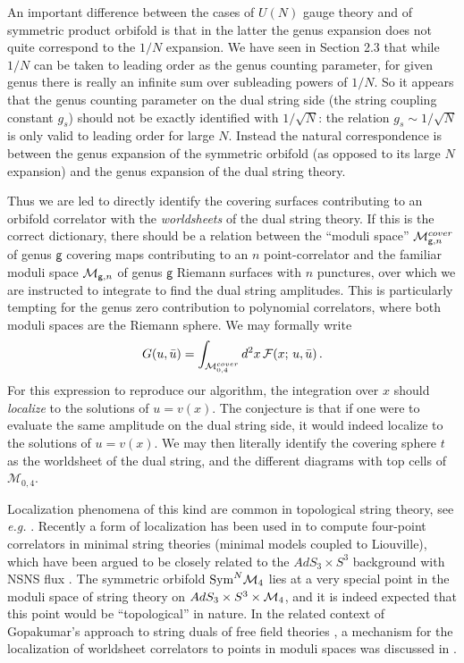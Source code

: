 \documentclass[letterpaper]{JHEP3}
\def\be{\begin{equation}}
\def\ee{\end{equation}}
\def\be{\begin{eqnarray}}
\def\ee{\end{eqnarray}}
\def\gg{\mathsf g }
\begin{document}
An important difference between the cases of  $U(N)$ gauge theory and of symmetric product orbifold
 is that in the  latter the genus expansion does not quite correspond to the $1/N$ expansion.
 We have seen in Section 2.3 that while $1/N$ can be taken to leading order as the genus counting parameter,
 for given genus there is really an infinite sum over subleading powers of $1/N$.
 So it appears that the genus counting parameter on the dual string side
(the string coupling constant $g_s$)   should not be exactly identified with $1/\sqrt{N}$:
the relation $g_s \sim 1/\sqrt{N}$ is only valid to leading order for large $N$.
Instead the natural correspondence is between the genus expansion
 of the symmetric orbifold (as opposed to its large $N$ expansion) and the genus expansion
 of the dual string theory. 
 
 Thus we are led to directly identify the covering surfaces contributing
 to an orbifold correlator   with the {\it worldsheets} of the dual string theory.
 If this  is the correct dictionary, there should be a relation between
   the ``moduli space''   ${\cal M}^{cover}_{\gg, n}$  
of genus $\gg$ covering maps contributing to an $n$ point-correlator 
   and the familiar moduli space    ${\cal M}_{\gg, n}$ of genus $\gg$ Riemann surfaces
   with $n$ punctures, over which we are instructed to integrate to find the dual string amplitudes.
   This is particularly tempting for the genus zero contribution to  polynomial correlators, where both moduli spaces
   are the Riemann sphere. We may formally write
\be
G(u,\bar u)=\int_{{\cal M}^{cover}_{0,4}} d^2x\, {\mathcal F}(x;\,u, \bar u) \, .
\ee
For this expression to reproduce our algorithm,  the integration over $x$ should {\it localize} to the solutions of $u=v(x)$.
The conjecture is that if one were to evaluate the same amplitude on the dual string side, it
 would indeed localize to the solutions of $u=v(x)$. We may then literally identify the covering sphere $t$ as the worldsheet of the dual string,
and the different diagrams  with top cells of ${\mathcal M}_{0,4}$. 

Localization phenomena of this kind
are common in topological string theory, see {\it e.g.} \cite{Verlinde:1990ku, Distler:1989ax}. Recently a form of localization has been used in \cite{Belavin:2006ex} to compute
four-point correlators in minimal string theories (minimal models coupled to Liouville), which have been argued
to be closely related to the $AdS_3 \times S^3$ background with NSNS flux \cite{Rastelli:2005ph}. The symmetric orbifold 
${\rm Sym}^N {\cal M}_4$ lies at a very special point in the moduli space of string theory on  $AdS_3 \times S^3 \times {\cal M}_4$,
and it is indeed expected that this point would be ``topological'' in nature. In the related context of Gopakumar's approach to string duals of free field theories \cite{Gopakumar:2005fx}, 
a mechanism for the localization of worldsheet correlators
to points in moduli spaces was discussed in \cite{Razamat:2008zr}.
\end{document}
